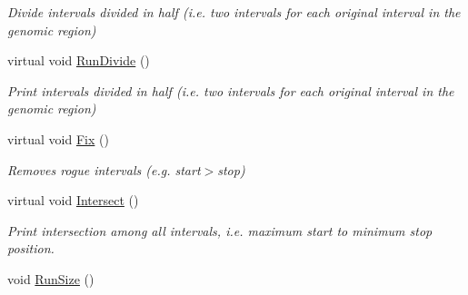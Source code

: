 \begin{DoxyCompactItemize}
\begin{DoxyCompactList}\small\item\em Divide intervals divided in half (i.e. two intervals for each original interval in the genomic region) \end{DoxyCompactList}\item 
\hypertarget{classGenomicRegion_a45fe5d619f2e21644eacb6984aa47eff}{
virtual void \hyperlink{classGenomicRegion_a45fe5d619f2e21644eacb6984aa47eff}{RunDivide} ()}
\label{classGenomicRegion_a45fe5d619f2e21644eacb6984aa47eff}

\begin{DoxyCompactList}\small\item\em Print intervals divided in half (i.e. two intervals for each original interval in the genomic region) \end{DoxyCompactList}\item 
\hypertarget{classGenomicRegion_a048d2182b212789b182c2c82a7ac131e}{
virtual void \hyperlink{classGenomicRegion_a048d2182b212789b182c2c82a7ac131e}{Fix} ()}
\label{classGenomicRegion_a048d2182b212789b182c2c82a7ac131e}

\begin{DoxyCompactList}\small\item\em Removes rogue intervals (e.g. start$>$stop) \end{DoxyCompactList}\item 
\hypertarget{classGenomicRegion_a8075e77ab6296b59506857cc21ee4c9d}{
virtual void \hyperlink{classGenomicRegion_a8075e77ab6296b59506857cc21ee4c9d}{Intersect} ()}
\label{classGenomicRegion_a8075e77ab6296b59506857cc21ee4c9d}

\begin{DoxyCompactList}\small\item\em Print intersection among all intervals, i.e. maximum start to minimum stop position. \end{DoxyCompactList}\item 
\hypertarget{classGenomicRegion_a08db190bc63e6f1d6fc90679dc5e6868}{
void \hyperlink{classGenomicRegion_a08db190bc63e6f1d6fc90679dc5e6868}{RunSize} ()}
\label{classGenomicRegion_a08db190bc63e6f1d6fc90679dc5e6868}


\end{DoxyCompactItemize}
